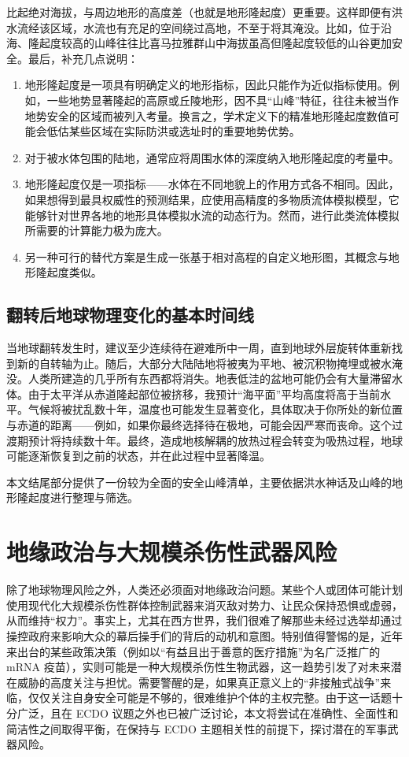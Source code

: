 \documentclass[10pt,twocolumn,letterpaper]{article}
\begin{document}
比起绝对海拔，与周边地形的高度差（也就是地形隆起度）更重要。这样即便有洪水流经该区域，水流也有充足的空间绕过高地，不至于将其淹没。比如，位于沿海、隆起度较高的山峰往往比喜马拉雅群山中海拔虽高但隆起度较低的山谷更加安全。最后，补充几点说明：
\begin{flushleft}
\begin{enumerate}
    \item 地形隆起度是一项具有明确定义的地形指标，因此只能作为近似指标使用。例如，一些地势显著隆起的高原或丘陵地形，因不具“山峰”特征，往往未被当作地势安全的区域而被列入考量。换言之，学术定义下的精准地形隆起度数值可能会低估某些区域在实际防洪或选址时的重要地势优势。
    \item 对于被水体包围的陆地，通常应将周围水体的深度纳入地形隆起度的考量中。
    \item 地形隆起度仅是一项指标——水体在不同地貌上的作用方式各不相同。因此，如果想得到最具权威性的预测结果，应使用高精度的多物质流体模拟模型，它能够针对世界各地的地形具体模拟水流的动态行为。然而，进行此类流体模拟所需要的计算能力极为庞大。
    \item 另一种可行的替代方案是生成一张基于相对高程的自定义地形图，其概念与地形隆起度类似。
\end{enumerate}
\end{flushleft}

\subsection{翻转后地球物理变化的基本时间线}
当地球翻转发生时，建议至少连续待在避难所中一周，直到地球外层旋转体重新找到新的自转轴为止。随后，大部分大陆陆地将被夷为平地、被沉积物掩埋或被水淹没。人类所建造的几乎所有东西都将消失。地表低洼的盆地可能仍会有大量滞留水体。由于太平洋从赤道隆起部位被挤移，我预计“海平面”平均高度将高于当前水平。气候将被扰乱数十年，温度也可能发生显著变化，具体取决于你所处的新位置与赤道的距离——例如，如果你最终选择待在极地，可能会因严寒而丧命。这个过渡期预计将持续数十年。最终，造成地核解耦的放热过程会转变为吸热过程，地球可能逐渐恢复到之前的状态，并在此过程中显著降温。

本文结尾部分提供了一份较为全面的安全山峰清单，主要依据洪水神话及山峰的地形隆起度进行整理与筛选。
\section{地缘政治与大规模杀伤性武器风险}

除了地球物理风险之外，人类还必须面对地缘政治问题。某些个人或团体可能计划使用现代化大规模杀伤性群体控制武器来消灭敌对势力、让民众保持恐惧或虚弱，从而维持“权力”。事实上，尤其在西方世界，我们很难了解那些未经过选举却通过操控政府来影响大众的幕后操手们的背后的动机和意图。特别值得警惕的是，近年来出台的某些政策决策（例如以“有益且出于善意的医疗措施”为名广泛推广的 mRNA 疫苗），实则可能是一种大规模杀伤性生物武器，这一趋势引发了对未来潜在威胁的高度关注与担忧。需要警醒的是，如果真正意义上的“非接触式战争”来临，仅仅关注自身安全可能是不够的，很难维护个体的主权完整。由于这一话题十分广泛，且在 ECDO 议题之外也已被广泛讨论，本文将尝试在准确性、全面性和简洁性之间取得平衡，在保持与 ECDO 主题相关性的前提下，探讨潜在的军事武器风险。
\end{document}
